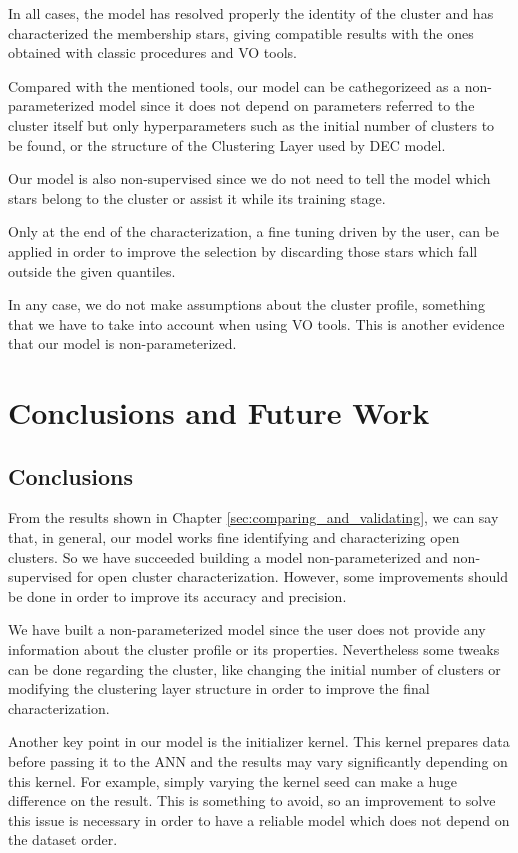\documentclass[11pt, a4paper, english]{book}
\begin{document}
In all cases, the model has resolved properly the identity of the cluster
and has characterized the membership stars,
giving compatible results with the ones obtained with classic procedures and VO tools.

Compared with the mentioned tools, our model can be cathegorizeed as a non-parameterized
model since it does not depend on parameters referred to the cluster itself
but only hyperparameters such as the initial number of clusters to be found,
or the structure of the Clustering Layer used by DEC model.

Our model is also non-supervised since we do not need to tell the model
which stars belong to the cluster or assist it while its training stage.

Only at the end of the characterization, a fine tuning driven by the user,
can be applied in order to improve the selection by discarding those
stars which fall outside the given quantiles.

In any case, we do not make assumptions about the cluster profile,
something that we have to take into account when using VO tools.
This is another evidence that our model is non-parameterized.

\chapter{Conclusions and Future Work}

\section{Conclusions}

From the results shown in Chapter \ref{sec:comparing_and_validating},
we can say that, in general, our model works fine identifying and characterizing open clusters.
So we have succeeded building a model non-parameterized and non-supervised for open cluster characterization.
However, some improvements should be done in order to improve its accuracy and precision.

We have built a non-parameterized model since the user does not provide any information
about the cluster profile or its properties.
Nevertheless some tweaks can be done regarding the cluster,
like changing the initial number of clusters or modifying the clustering layer structure
in order to improve the final characterization.

Another key point in our model is the initializer kernel.
This kernel prepares data before passing it to the ANN
and the results may vary significantly depending on this kernel.
For example, simply varying the kernel seed can make a huge difference on the result.
This is something to avoid, so an improvement to solve this issue is necessary in order
to have a reliable model which does not depend on the dataset order.
\end{document}
